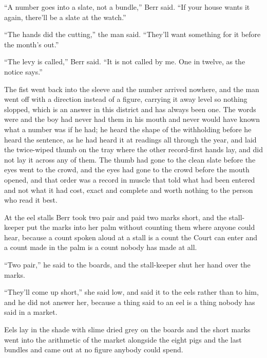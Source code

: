 “A number goes into a slate, not a bundle,” Berr said. “If your house wants it again, there'll be a slate at the watch.”

“The hands did the cutting,” the man said. “They'll want something for it before the month's out.”

“The levy is called,” Berr said. “It is not called by me. One in twelve, as the notice says.”

The fist went back into the sleeve and the number arrived nowhere, and the man went off with a direction instead of a figure, carrying it away level so nothing slopped, which is an answer in this district and has always been one. The words were  and the boy had never had them in his mouth and never would have known what a number was if he had; he heard the shape of the withholding before he heard the sentence, as he had heard it at readings all through the year, and laid the twice-wiped thumb on the tray where the other record-first hands lay, and did not lay it across any of them. The thumb had gone to the clean slate before the eyes went to the crowd, and the eyes had gone to the crowd before the mouth opened, and that order was a record in muscle that told what had been entered and not what it had cost, exact and complete and worth nothing to the person who read it best.

\scenebreak

At the eel stalls Berr took two pair and paid two marks short, and the stall-keeper put the marks into her palm without counting them where anyone could hear, because a count spoken aloud at a stall is a count the Court can enter and a count made in the palm is a count nobody has made at all.

“Two pair,” he said to the boards, and the stall-keeper shut her hand over the marks.

“They'll come up short,” she said low, and said it to the eels rather than to him, and he did not answer her, because a thing said to an eel is a thing nobody has said in a market.

Eels lay in the shade with slime dried grey on the boards and the short marks went into the arithmetic of the market alongside the eight pigs and the last bundles and came out at no figure anybody could spend.

